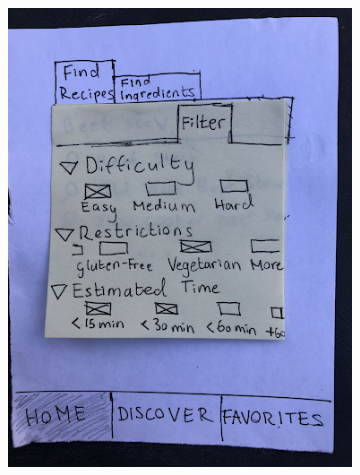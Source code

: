 \documentclass[11pt,english]{article}
\begin{document}
\begin{figure}
\begin{subfigure}[b]{0.4\linewidth}
    \includegraphics[width=\linewidth]{figure8v2.png}
  \end{subfigure}
    \begin{subfigure}[b]{0.4\linewidth}

\end{subfigure}
\end{figure}
\end{document}
